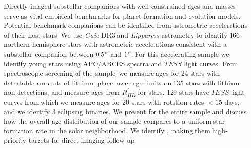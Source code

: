 Directly imaged substellar companions with well-constrained ages and masses serve as vital empirical benchmarks for planet formation and evolution models. Potential benchmark companions can be identified from astrometric accelerations of their host stars. We use \textit{Gaia} DR3 and \textit{Hipparcos} astrometry to identify 166 northern hemisphere stars with astrometric accelerations consistent with a substellar companion between $0.5"$ and $1"$. For this accelerating sample we identify young stars using APO/ARCES spectra and $TESS$ light curves. From spectroscopic screening of the sample, we measure ages for 24 stars with detectable amounts of lithium, place lower age limits on 135 stars with lithium non-detections, and measure ages from $R^{'}_{HK}$ for  stars. 129 stars have  $TESS$ light curves from which we measure ages for 20 stars with rotation rates $<15$ days, and we identify 3 eclipsing binaries. We present  for the entire sample and discuss how the overall age distribution of our sample compares to a uniform star formation rate in the solar neighborhood. We identify , making them high-priority targets for direct imaging follow-up.


